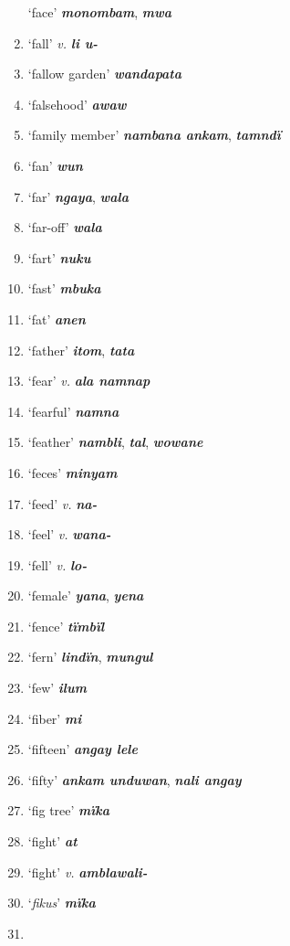 \begin{enumerate}[noitemsep, label={}, align=left, widest=190, labelsep=1ex,leftmargin=*,itemindent=-10pt]
‘face’ \textbf{\textit{monombam}}, \textbf{\textit{mwa}} \item
‘fall’ \textit{v.} \textbf{\textit{li u-}} \item
‘fallow garden’ \textbf{\textit{wandapata}} \item
‘falsehood’ \textbf{\textit{awaw}} \item
‘family member’ \textbf{\textit{nambana ankam}}, \textbf{\textit{tamndï}} \item
‘fan’ \textbf{\textit{wun}} \item
‘far’ \textbf{\textit{ngaya}}, \textbf{\textit{wala}} \item
‘far-off’ \textbf{\textit{wala}} \item
‘fart’ \textbf{\textit{nuku}} \item
‘fast’ \textbf{\textit{mbuka}} \item
‘fat’ \textbf{\textit{anen}} \item
‘father’ \textbf{\textit{itom}}, \textbf{\textit{tata}} \item
‘fear’ \textit{v.} \textbf{\textit{ala namnap}} \item
‘fearful’ \textbf{\textit{namna}} \item
‘feather’ \textbf{\textit{nambli}}, \textbf{\textit{tal}}, \textbf{\textit{wowane}} \item
‘feces’ \textbf{\textit{minyam}} \item
‘feed’ \textit{v.} \textbf{\textit{na-}} \item
‘feel’ \textit{v.} \textbf{\textit{wana-}} \item
‘fell’ \textit{v.} \textbf{\textit{lo-}} \item
‘female’ \textbf{\textit{yana}}, \textbf{\textit{yena}} \item
‘fence’ \textbf{\textit{tïmbïl}} \item
‘fern’ \textbf{\textit{lindïn}}, \textbf{\textit{mungul}} \item
‘few’ \textbf{\textit{ilum}} \item
‘fiber’ \textbf{\textit{mi}} \item
‘fifteen’ \textbf{\textit{angay lele}} \item
‘fifty’ \textbf{\textit{ankam unduwan}}, \textbf{\textit{nali angay}} \item
‘fig tree’ \textbf{\textit{mïka}} \item
‘fight’ \textbf{\textit{at}} \item
‘fight’ \textit{v.} \textbf{\textit{amblawali-}} \item
‘\textit{fikus}’ \textbf{\textit{mïka}} \item

\end{enumerate}
